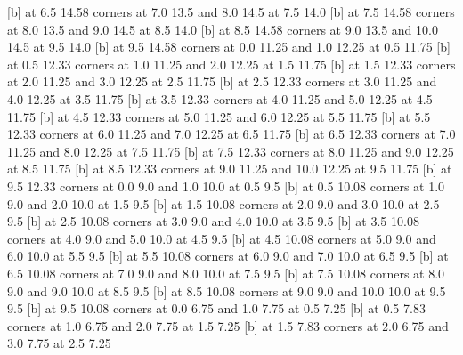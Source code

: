  [b] at 6.5 14.58
\putrectangle corners at 7.0 13.5 and 8.0 14.5
 at 7.5 14.0
 [b] at 7.5 14.58
\putrectangle corners at 8.0 13.5 and 9.0 14.5
 at 8.5 14.0
 [b] at 8.5 14.58
\putrectangle corners at 9.0 13.5 and 10.0 14.5
 at 9.5 14.0
 [b] at 9.5 14.58
\putrectangle corners at 0.0 11.25 and 1.0 12.25
 at 0.5 11.75
 [b] at 0.5 12.33
\putrectangle corners at 1.0 11.25 and 2.0 12.25
 at 1.5 11.75
 [b] at 1.5 12.33
\putrectangle corners at 2.0 11.25 and 3.0 12.25
 at 2.5 11.75
 [b] at 2.5 12.33
\putrectangle corners at 3.0 11.25 and 4.0 12.25
 at 3.5 11.75
 [b] at 3.5 12.33
\putrectangle corners at 4.0 11.25 and 5.0 12.25
 at 4.5 11.75
 [b] at 4.5 12.33
\putrectangle corners at 5.0 11.25 and 6.0 12.25
 at 5.5 11.75
 [b] at 5.5 12.33
\putrectangle corners at 6.0 11.25 and 7.0 12.25
 at 6.5 11.75
 [b] at 6.5 12.33
\putrectangle corners at 7.0 11.25 and 8.0 12.25
 at 7.5 11.75
 [b] at 7.5 12.33
\putrectangle corners at 8.0 11.25 and 9.0 12.25
 at 8.5 11.75
 [b] at 8.5 12.33
\putrectangle corners at 9.0 11.25 and 10.0 12.25
 at 9.5 11.75
 [b] at 9.5 12.33
\putrectangle corners at 0.0 9.0 and 1.0 10.0
 at 0.5 9.5
 [b] at 0.5 10.08
\putrectangle corners at 1.0 9.0 and 2.0 10.0
 at 1.5 9.5
 [b] at 1.5 10.08
\putrectangle corners at 2.0 9.0 and 3.0 10.0
 at 2.5 9.5
 [b] at 2.5 10.08
\putrectangle corners at 3.0 9.0 and 4.0 10.0
 at 3.5 9.5
 [b] at 3.5 10.08
\putrectangle corners at 4.0 9.0 and 5.0 10.0
 at 4.5 9.5
 [b] at 4.5 10.08
\putrectangle corners at 5.0 9.0 and 6.0 10.0
 at 5.5 9.5
 [b] at 5.5 10.08
\putrectangle corners at 6.0 9.0 and 7.0 10.0
 at 6.5 9.5
 [b] at 6.5 10.08
\putrectangle corners at 7.0 9.0 and 8.0 10.0
 at 7.5 9.5
 [b] at 7.5 10.08
\putrectangle corners at 8.0 9.0 and 9.0 10.0
 at 8.5 9.5
 [b] at 8.5 10.08
\putrectangle corners at 9.0 9.0 and 10.0 10.0
 at 9.5 9.5
 [b] at 9.5 10.08
\putrectangle corners at 0.0 6.75 and 1.0 7.75
 at 0.5 7.25
 [b] at 0.5 7.83
\putrectangle corners at 1.0 6.75 and 2.0 7.75
 at 1.5 7.25
 [b] at 1.5 7.83
\putrectangle corners at 2.0 6.75 and 3.0 7.75
 at 2.5 7.25

